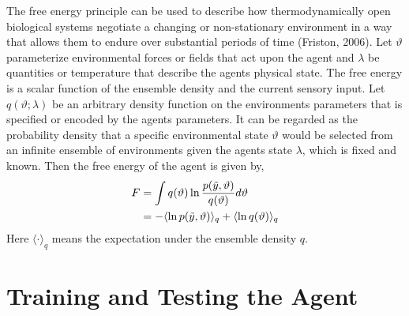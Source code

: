 \documentclass{article}
\begin{document}
The free energy principle can be used to describe how thermodynamically open biological systems negotiate a changing or non-stationary environment in a way that allows them to endure over substantial periods of time (Friston, 2006). Let $\vartheta$ parameterize environmental forces or fields that act upon the agent and $\lambda$ be quantities or temperature that describe the agents physical state. The free energy is a scalar function of the ensemble density and the current sensory input. Let $q(\vartheta ;\lambda)$ be an arbitrary density function on the environments parameters that is specified or encoded by the agents parameters. It can be regarded as the probability density that a specific environmental state $\vartheta$ would be selected from an infinite ensemble of environments given the agents state $\lambda$, which is fixed and known. Then the free energy of the agent is given by, 
\begin{align}\label{eq:free-energy-1}
\begin{split} 
    F &= \int q(\vartheta) \ln \frac{p(\Tilde{y},\vartheta)}{q(\vartheta)} d\vartheta \\
    &= - \langle \ln p(\Tilde{y},\vartheta) \rangle_q + \langle \ln q(\vartheta) \rangle_q
\end{split}
\end{align}
Here $\langle \cdot \rangle_q$ means the expectation under the ensemble density $q$.






\section{Training and Testing the Agent}
\end{document}
